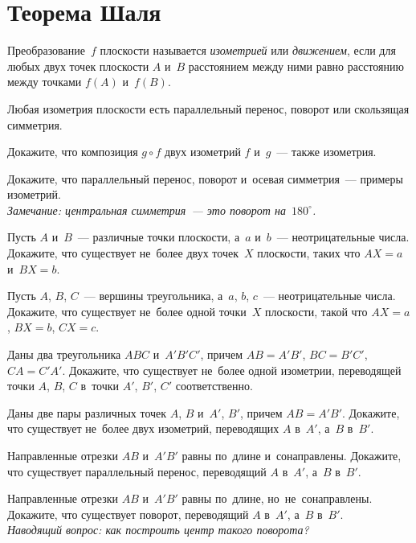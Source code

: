 
\section*{Теорема Шаля}


Преобразование~$f$ плоскости называется \emph{изометрией} или \emph{движением},
если для любых двух точек плоскости $A$ и~$B$ расстоянием между ними равно
расстоянию между точками $f(A)$ и~$f(B)$.

Любая изометрия плоскости есть параллельный перенос, поворот или скользящая
симметрия.

\begin{problems}

\item
Докажите, что композиция $g \circ f$ двух изометрий $f$ и~$g$~--- также
изометрия.

\item
Докажите, что параллельный перенос, поворот и~осевая симметрия~--- примеры
изометрий.
\\
\emph{Замечание: центральная симметрия~--- это поворот на~$180^{\circ}$.}

\item
Пусть $A$ и~$B$~--- различные точки плоскости, а~$a$ и~$b$~--- неотрицательные
числа.
Докажите, что существует не~более двух точек~$X$ плоскости, таких что $AX = a$
и~$BX = b$.

\item
Пусть $A$, $B$, $C$~--- вершины треугольника, а~$a$, $b$, $c$~---
неотрицательные числа.
Докажите, что существует не~более одной точки~$X$ плоскости, такой что
$AX = a$, $BX = b$, $CX = c$.

\item
Даны два треугольника $ABC$ и~$A'B'C'$, причем
$AB = A'B'$, $BC = B'C'$, $CA = C'A'$.
Докажите, что существует не~более одной изометрии, переводящей
точки $A$, $B$, $C$ в~точки $A'$, $B'$, $C'$ соответственно.

\item
Даны две пары различных точек $A$, $B$ и~$A'$, $B'$, причем $AB = A'B'$.
Докажите, что существует не~более двух изометрий, переводящих
$A$ в~$A'$, а~$B$ в~$B'$.

\item
Направленные отрезки $AB$ и~$A'B'$ равны по~длине и~сонаправлены.
Докажите, что существует параллельный перенос, переводящий
$A$ в~$A'$, а~$B$ в~$B'$.

\item
Направленные отрезки $AB$ и~$A'B'$ равны по~длине, но~не~сонаправлены.
Докажите, что существует поворот, переводящий $A$ в~$A'$, а~$B$ в~$B'$.
\\
\emph{Наводящий вопрос: как построить центр такого поворота?}

\end{problems}

